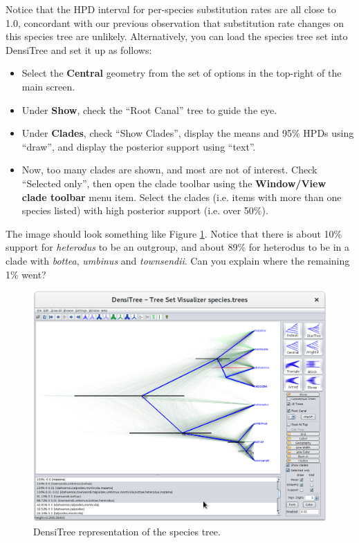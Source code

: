 \documentclass{article}
\begin{document}
Notice that the HPD interval for per-species substitution rates are all close to
1.0, concordant with our previous observation that substitution rate changes on
this species tree are unlikely. Alternatively, you can load the species tree set
into DensiTree and set it up as follows:

\begin{itemize}
\item Select the \textbf{Central} geometry from the set of options in the top-right of the main screen.
\item Under \textbf{Show}, check the ``Root Canal'' tree to guide the eye.
\item Under \textbf{Clades}, check ``Show Clades'', display the means and 95\% HPDs using ``draw'', and display the posterior support
using ``text''.
\item Now, too many clades are shown, and most are not of interest. Check
``Selected only'', then open the clade toolbar using the \textbf{Window/View clade toolbar}
menu item. Select the clades (i.e. items with more than one species listed)
with high posterior support (i.e. over 50\%).
\end{itemize}

The image should look something like Figure \ref{fig:densitree}. Notice that
there is about 10\% support for \textit{heterodus} to be an outgroup, and about
89\% for heterodus to be in a clade with \textit{bottea}, \textit{umbinus} and
\textit{townsendii}. Can you explain where the remaining 1\% went?

\begin{figure}
\centering
\includegraphics[width=\textwidth]{figures/densitree.png}
\caption{DensiTree representation of the species tree.}
\label{fig:densitree}
\end{figure}
\end{document}
